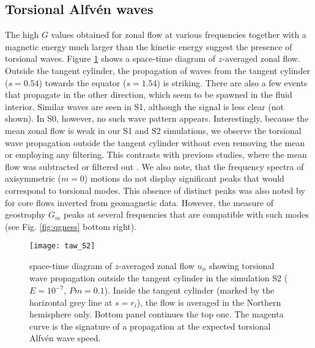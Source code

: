 \documentclass[12pt, a4paper]{article}
\begin{document}
\subsection{Torsional Alfvén waves}

The high $G$ values obtained for zonal flow at various frequencies together with a magnetic energy much larger than the kinetic energy suggest the presence of torsional waves.
Figure \ref{fig:taw_S2} shows a space-time diagram of $z$-averaged zonal flow.
Outside the tangent cylinder, the propagation of waves from the tangent cylinder ($s=0.54$) towards the equator ($s=1.54$) is striking.
There are also a few events that propagate in the other direction, which seem to be spawned in the fluid interior.
Similar waves are seen in S1, although the signal is less clear (not shown). In S0, however, no such wave pattern appears.
Interestingly, because the mean zonal flow is weak in our S1 and S2 simulations, we observe the torsional wave propagation outside the tangent cylinder without even removing the mean or employing any filtering.
This contrasts with previous studies, where the mean flow was subtracted or filtered out \citep{wicht2010, teed2014}.
We also note, that the frequency spectra of axisymmetric ($m=0$) motions do not display significant peaks that would correspond to torsional modes.
This absence of distinct peaks was also noted by \citet{gillet2015} for core flows inverted from geomagnetic data.
However, the measure of geostrophy $G_m$ peaks at several frequencies that are compatible with such modes (see Fig. \ref{fig:qgness} bottom right).

\begin{figure}
\begin{center}
\texttt{[image: taw\_S2]}
\caption{space-time diagram of $z$-averaged zonal flow $u_\phi$ showing torsional wave propagation outside the tangent cylinder in the simulation S2 ($E=10^{-7}$, $Pm=0.1$).
Inside the tangent cylinder (marked by the horizontal grey line at $s=r_i$), the flow is averaged in the Northern hemisphere only.
Bottom panel continues the top one.
The magenta curve is the signature of a propagation at the expected torsional Alfvén wave speed.
}
\label{fig:taw_S2}
\end{center}
\end{figure}
\end{document}

